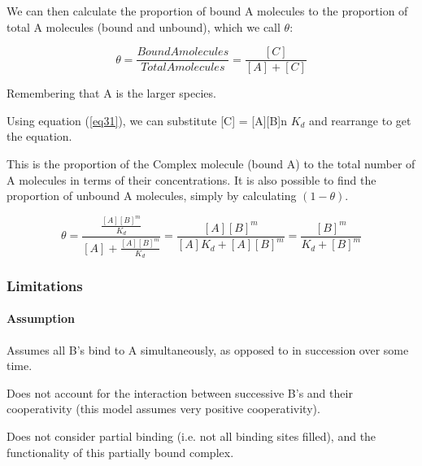 \documentclass[11pt, letterpaper, english]{article}
\begin{document}
    \par{We can then calculate the proportion of bound A molecules to the proportion of total A molecules (bound and unbound), which we call $\theta$:}
    
    \begin{equation}
        \theta= \frac{Bound A molecules}{Total A molecules}=\frac{[C]}{[A]+[C]}
    \end{equation}
    
    \par{Remembering that A is the larger species.}
    
    \par{Using equation (\ref{eq31}), we can substitute [C] = [A][B]n $K_d$ and rearrange to get the equation.}


    
    \par{This is the proportion of the Complex molecule (bound A) to the total number of A molecules in terms of their concentrations. It is also possible to find the proportion of unbound A molecules, simply by calculating $(1-\theta)$.}
    
    \begin{equation}
        \theta = \frac{ \frac{[A]{[B]}^m}{K_d} }{ [A] + \frac{[A]{[B]}^m}{K_d} }= \frac{[A]{[B]}^m}{[A] K_d + [A] {[B]}^m} = \frac{{[B]}^m}{ K_d + {[B]}^m}
    \end{equation}
    
    \subsubsection{Limitations}
    
    \paragraph{Assumption}
    
    \par{Assumes all B's bind to A simultaneously, as opposed to in succession over some time.}
    
    \par{Does not account for the interaction between successive B's and their cooperativity (this model assumes very positive cooperativity).}
    
    \par{Does not consider partial binding (i.e. not all binding sites filled), and the functionality of this partially bound complex.}
    
\end{document}
